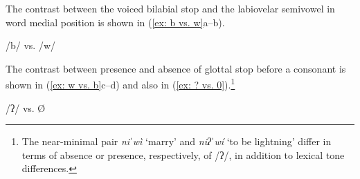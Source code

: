 The contrast between the voiced bilabial stop and the labiovelar semivowel in word medial position is shown in (\ref{ex: b vs. w}a--b).

\ea\label{ex: b vs. w}
{/b/ vs. /w/}

    \z
\z

The contrast between presence and absence of glottal stop before a consonant is shown in (\ref{ex: w vs. b}c--d) and also in (\ref{ex: ? vs. 0}).\footnote{The near-minimal pair \textit{niˈwì} ‘marry’ and \textit{niʔˈwí} ‘to be lightning’ differ in terms of absence or presence, respectively, of /ʔ/, in addition to lexical tone differences.}

\ea\label{ex: ? vs. 0}
{/ʔ/ vs. Ø}

